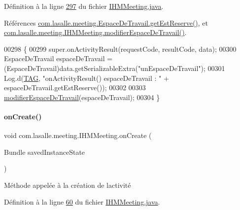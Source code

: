 Définition à la ligne \hyperlink{_i_h_m_meeting_8java_source_l00297}{297} du fichier \hyperlink{_i_h_m_meeting_8java_source}{I\+H\+M\+Meeting.\+java}.



Références \hyperlink{_espace_de_travail_8java_source_l00117}{com.\+lasalle.\+meeting.\+Espace\+De\+Travail.\+get\+Est\+Reserve()}, et \hyperlink{_i_h_m_meeting_8java_source_l00214}{com.\+lasalle.\+meeting.\+I\+H\+M\+Meeting.\+modifier\+Espace\+De\+Travail()}.


\begin{DoxyCode}
00298     \{
00299         super.onActivityResult(requestCode, resultCode, data);
00300         EspaceDeTravail espaceDeTravail = (EspaceDeTravail)data.getSerializableExtra(\textcolor{stringliteral}{"unEspaceDeTravail"});
00301         Log.d(\hyperlink{classcom_1_1lasalle_1_1meeting_1_1_i_h_m_meeting_a239eafcb0ccc896bdba538d1c0f08e65}{TAG}, \textcolor{stringliteral}{"onActivityResult() espaceDeTravail : "} + espaceDeTravail.getEstReserve());
00302 
00303         \hyperlink{classcom_1_1lasalle_1_1meeting_1_1_i_h_m_meeting_a3367c0a9b9743ca7808cb2265789f9b8}{modifierEspaceDeTravail}(espaceDeTravail);
00304     \}
\end{DoxyCode}
\mbox{\label{classcom_1_1lasalle_1_1meeting_1_1_i_h_m_meeting_a34012ee88c1e079fef93ed115978d669}} 
\paragraph{\texorpdfstring{on\+Create()}{onCreate()}}
{\footnotesize\ttfamily void com.\+lasalle.\+meeting.\+I\+H\+M\+Meeting.\+on\+Create (\begin{DoxyParamCaption}\item[{Bundle}]{saved\+Instance\+State }\end{DoxyParamCaption})\hspace{0.3cm}{\ttfamily [protected]}}



Méthode appelée à la création de l\textquotesingle{}activité 



Définition à la ligne \hyperlink{_i_h_m_meeting_8java_source_l00060}{60} du fichier \hyperlink{_i_h_m_meeting_8java_source}{I\+H\+M\+Meeting.\+java}.



